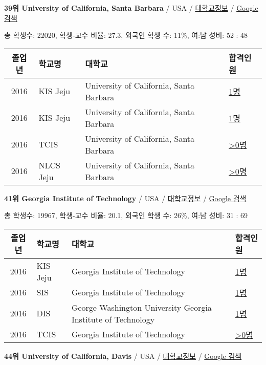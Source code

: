 \documentclass[13pt,]{article}
\begin{document}
\textbf{39위 University of California, Santa Barbara} / USA /
\href{https://www.timeshighereducation.com/world-university-rankings/university-of-california-santa-barbara?ranking-dataset=133819}{대학교정보}
/
\href{http://www.google.com/search?q=University+of+California,+Santa+Barbara}{Google
검색}

총 학생수: 22020, 학생-교수 비율: 27.3, 외국인 학생 수: 11\%, 여:남
성비: 52 : 48

\begin{longtable}[]{@{}clll@{}}
\toprule
졸업년 & 학교명 & 대학교 & 합격인원\tabularnewline
\midrule
\endhead
2016 & KIS Jeju & University of California, Santa Barbara &
\href{http://cafe.naver.com/assarabia/11596}{1명}\tabularnewline
2016 & KIS Jeju & University of California, Santa Barbara &
\href{http://cafe.naver.com/assarabia/11596}{1명}\tabularnewline
2016 & TCIS & University of California, Santa Barbara &
\href{http://cafe.naver.com/assarabia/11598}{\textgreater{}0명}\tabularnewline
2016 & NLCS Jeju & University of California, Santa Barbara &
\href{http://cafe.naver.com/assarabia/11592}{\textgreater{}0명}\tabularnewline
\bottomrule
\end{longtable}

\textbf{41위 Georgia Institute of Technology} / USA /
\href{https://www.timeshighereducation.com/world-university-rankings/georgia-institute-of-technology?ranking-dataset=133819}{대학교정보}
/
\href{http://www.google.com/search?q=Georgia+Institute+of+Technology}{Google
검색}

총 학생수: 19967, 학생-교수 비율: 20.1, 외국인 학생 수: 26\%, 여:남
성비: 31 : 69

\begin{longtable}[]{@{}clll@{}}
\toprule
졸업년 & 학교명 & 대학교 & 합격인원\tabularnewline
\midrule
\endhead
2016 & KIS Jeju & Georgia Institute of Technology &
\href{http://cafe.naver.com/assarabia/11596}{1명}\tabularnewline
2016 & SIS & Georgia Institute of Technology &
\href{http://cafe.naver.com/assarabia/11589}{1명}\tabularnewline
2016 & DIS & George Washington University Georgia Institute of
Technology &
\href{http://cafe.naver.com/assarabia/11591}{1명}\tabularnewline
2016 & TCIS & Georgia Institute of Technology &
\href{http://cafe.naver.com/assarabia/11598}{\textgreater{}0명}\tabularnewline
\bottomrule
\end{longtable}

\textbf{44위 University of California, Davis} / USA /
\href{https://www.timeshighereducation.com/world-university-rankings/university-of-california-davis?ranking-dataset=133819}{대학교정보}
/
\href{http://www.google.com/search?q=University+of+California,+Davis}{Google
검색}
\end{document}
